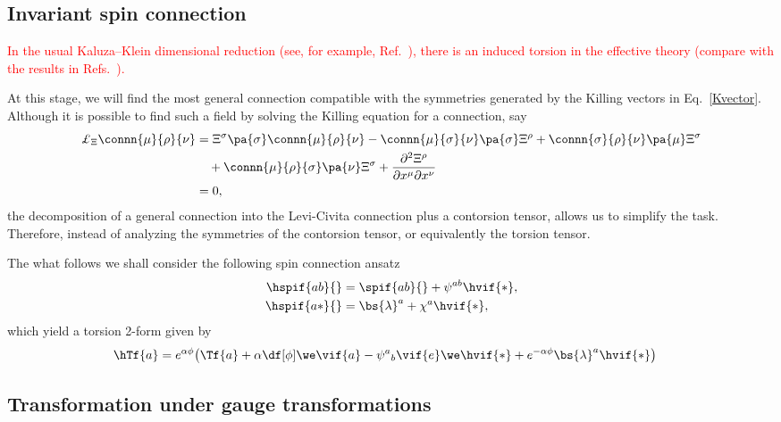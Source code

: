 \documentclass[aps,prd,12pt,superscriptaddress,showpacs,showkeys,reprint]{revtex4-1}
\begin{document}
\subsection*{Invariant spin connection}

\textcolor{red}{In the usual Kaluza--Klein dimensional reduction (see, for example, Ref.~\cite{PopeKK}), there is an induced torsion in the effective theory (compare with the results in Refs.~\cite{PhysRevD.17.3141,PhysRevD.19.430}).}

At this stage, we will find the most general connection compatible with the symmetries generated by the Killing vectors in Eq.~\eqref{Kvector}. Although it is possible to find such a field by solving the Killing equation for a connection, say~\cite{Tilquin:2011bu}
\begin{equation}
  \begin{split}
    \pounds_\Xi \connn{\mu}{\rho}{\nu} &= \Xi^\sigma \pa{\sigma} \connn{\mu}{\rho}{\nu} - \connn{\mu}{\sigma}{\nu} \pa{\sigma} \Xi^\rho + \connn{\sigma}{\rho}{\nu} \pa{\mu} \Xi^\sigma \\
    & \quad + \connn{\mu}{\rho}{\sigma} \pa{\nu} \Xi^\sigma + \frac{ \partial^2 \Xi^\rho }{ \partial x^\mu \partial x^\nu} \\
    &= 0,
  \end{split}
\end{equation}
the decomposition of a general connection into the Levi-Civita connection plus a contorsion tensor, allows us to simplify the task. Therefore, instead of analyzing the symmetries of the contorsion tensor, or equivalently the torsion tensor.

The what follows we shall consider the following spin connection ansatz
\begin{equation}
  \begin{split}
    \hspif{ab}{} &= \spif{ab}{} + \psi^{ab} \hvif{*}, \\
    \hspif{a*}{} &= \bs{\lambda}^a + \chi^a \hvif{*},
  \end{split}
\end{equation}
which yield a torsion 2-form given by
\begin{equation}
  \begin{split}
    \hTf{a} &= e^{\alpha \phi} \big( \Tf{a} + \alpha \df[\phi] \we \vif{a}  - \psi^a{}_b \vif{e} \we \hvif{*} + e^{- \alpha \phi} \bs{\lambda}^a \hvif{*} \big)
  \end{split}
\end{equation}

\subsection*{Transformation under gauge transformations}
\end{document}
